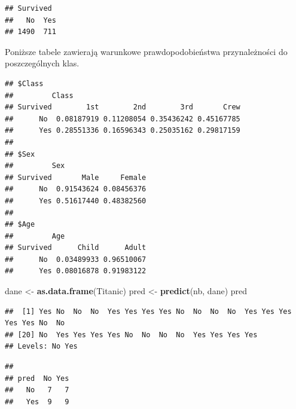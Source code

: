\documentclass[
]{book}
\newenvironment{Shaded}{\begin{snugshade}}{\end{snugshade}}
\newcommand{\KeywordTok}[1]{\textcolor[rgb]{0.13,0.29,0.53}{\textbf{#1}}}
\newcommand{\NormalTok}[1]{#1}
\newcommand{\OperatorTok}[1]{\textcolor[rgb]{0.81,0.36,0.00}{\textbf{#1}}}
\newcommand{\StringTok}[1]{\textcolor[rgb]{0.31,0.60,0.02}{#1}}
\theoremstyle{plain}
\theoremstyle{definition}
\theoremstyle{definition}
\theoremstyle{definition}
\theoremstyle{definition}
\theoremstyle{remark}
\begin{document}
\begin{verbatim}
## Survived
##   No  Yes 
## 1490  711
\end{verbatim}

Poniższe tabele zawierają warunkowe prawdopodobieństwa przynależności do poszczególnych klas.

\begin{Shaded}
\end{Shaded}

\begin{verbatim}
## $Class
##         Class
## Survived        1st        2nd        3rd       Crew
##      No  0.08187919 0.11208054 0.35436242 0.45167785
##      Yes 0.28551336 0.16596343 0.25035162 0.29817159
## 
## $Sex
##         Sex
## Survived       Male     Female
##      No  0.91543624 0.08456376
##      Yes 0.51617440 0.48382560
## 
## $Age
##         Age
## Survived      Child      Adult
##      No  0.03489933 0.96510067
##      Yes 0.08016878 0.91983122
\end{verbatim}

\begin{Shaded}
\begin{Highlighting}[]
\NormalTok{dane <-}\StringTok{ }\KeywordTok{as.data.frame}\NormalTok{(Titanic)}
\NormalTok{pred <-}\StringTok{ }\KeywordTok{predict}\NormalTok{(nb, dane)}
\NormalTok{pred}
\end{Highlighting}
\end{Shaded}

\begin{verbatim}
##  [1] Yes No  No  No  Yes Yes Yes Yes No  No  No  No  Yes Yes Yes Yes Yes No  No 
## [20] No  Yes Yes Yes Yes No  No  No  No  Yes Yes Yes Yes
## Levels: No Yes
\end{verbatim}

\begin{Shaded}
\end{Shaded}

\begin{verbatim}
##      
## pred  No Yes
##   No   7   7
##   Yes  9   9
\end{verbatim}
\end{document}
